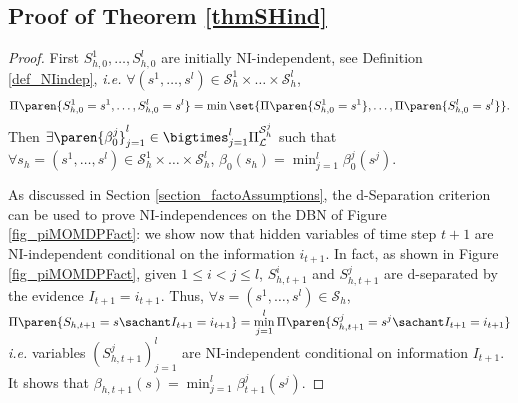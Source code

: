 \subsection{Proof of Theorem \ref{thmSHind}}
\label{thmSHind_RETURN}
\begin{proof}
First $S^1_{h,0}, \ldots,S^l_{h,0}$ are initially NI-independent, see Definition \ref{def_NIindep}, \textit{i.e.}
$\forall (s^1,\ldots,s^l) \in \mathcal{S}^1_h \times \ldots \times \mathcal{S}^l_h$,
\[ \Pi \paren{ S^1_{h,0} = s^1, \ldots, S^l_{h,0} = s^l } = \min \set{ \Pi \paren{ S^1_{h,0} = s^1 }, \ldots, \Pi \paren{ S^l_{h,0} = s^l }}. \]
Then $\exists \paren{\beta^j_0}_{j=1}^{l} \in \displaystyle \bigtimes_{j=1}^{l} \Pi^{\mathcal{S}^j_h}_{\mathcal{L}}$
such that $\forall s_h = (s^1,\ldots,s^l) \in \mathcal{S}^1_h \times \ldots \times \mathcal{S}^l_h$,
$\beta_0(s_h) = \displaystyle \min_{j=1}^l \beta^j_0(s^j)$. 



As discussed in Section \ref{section_factoAssumptions},
the d-Separation criterion can be used to prove 
NI-independences on the DBN of Figure \ref{fig_piMOMDPFact}:
we show now that hidden variables of time step $t+1$ are NI-independent 
conditional on the information $i_{t+1}$.
In fact, as shown in Figure \ref{fig_piMOMDPFact}, given $1 \leqslant i < j \leqslant l$,
$S^i_{h,t+1}$ and $S^j_{h,t+1}$ are d-separated by the evidence $I_{t+1} = i_{t+1}$. 
Thus, $\forall s = (s^1,\ldots,s^l) \in \mathcal{S}_h$, 
$\displaystyle \Pi \paren{ S_{h,t+1} = s \sachant I_{t+1} = i_{t+1} } 
= \min_{j=1}^l \Pi \paren{S^j_{h,t+1} = s^j \sachant I_{t+1} = i_{t+1} }$ 
\textit{i.e.} variables $(S^j_{h,t+1})_{j=1}^l$ are NI-independent
conditional on information $I_{t+1}$.
It shows that $ \displaystyle \beta_{h,t+1}(s) =
\min_{j=1}^l \beta^j_{t+1}(s^j)$. 


\end{proof}
